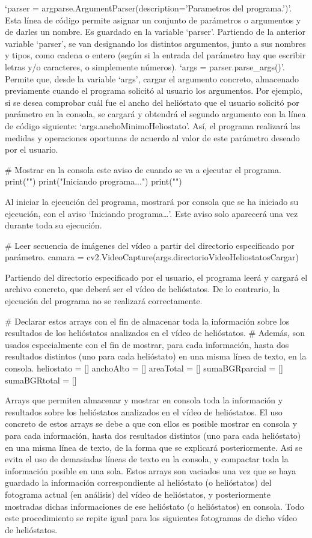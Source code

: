 ‘parser = argparse.ArgumentParser(description='Parametros del programa.')’. Esta línea de código permite asignar un conjunto de parámetros o argumentos y de darles un nombre. Es guardado en la variable ‘parser’.
Partiendo de la anterior variable ‘parser’, se van designando los distintos argumentos, junto a sus nombres y tipos, como cadena o entero (según si la entrada del parámetro hay que escribir letras y/o caracteres, o simplemente números).
‘args = parser.parse\_args()’. Permite que, desde la variable ‘args’, cargar el argumento concreto, almacenado previamente cuando el programa solicitó al usuario los argumentos. Por ejemplo, si se desea comprobar cuál fue el ancho del helióstato que el usuario solicitó por parámetro en la consola, se cargará y obtendrá el segundo argumento con la línea de código siguiente: ‘args.anchoMinimoHeliostato’. Así, el programa realizará las medidas y operaciones oportunas de acuerdo al valor de este parámetro deseado por el usuario.


\# Mostrar en la consola este aviso de cuando se va a ejecutar el programa.
print("")
print("Iniciando programa...")
print("")

Al iniciar la ejecución del programa, mostrará por consola que se ha iniciado su ejecución, con el aviso ‘Iniciando programa…’. Este aviso solo aparecerá una vez durante toda su ejecución.


\# Leer secuencia de imágenes del vídeo a partir del directorio especificado por parámetro.
camara = cv2.VideoCapture(args.directorioVideoHeliostatosCargar)

Partiendo del directorio especificado por el usuario, el programa leerá y cargará el archivo concreto, que deberá ser el vídeo de helióstatos. De lo contrario, la ejecución del programa no se realizará correctamente.


\# Declarar estos arrays con el fin de almacenar toda la información sobre los resultados de los helióstatos analizados en el vídeo de helióstatos.
\# Además, son usados especialmente con el fin de mostrar, para cada información, hasta dos resultados distintos (uno para cada helióstato) en una misma línea de texto, en la consola.
heliostato = []
anchoAlto = []
areaTotal = []
sumaBGRparcial = []
sumaBGRtotal = []

Arrays que permiten almacenar y mostrar en consola toda la información y resultados sobre los helióstatos analizados en el vídeo de helióstatos. El uso concreto de estos arrays se debe a que con ellos es posible mostrar en consola y para cada información, hasta dos resultados distintos (uno para cada helióstato) en una misma línea de texto, de la forma que se explicará posteriormente. Así se evita el uso de demasiadas líneas de texto en la consola, y compactar toda la información posible en una sola. Estos arrays son vaciados una vez que se haya guardado la información correspondiente al helióstato (o helióstatos) del fotograma actual (en análisis) del vídeo de helióstatos, y posteriormente mostradas dichas informaciones de ese helióstato (o helióstatos) en consola. Todo este procedimiento se repite igual para los siguientes fotogramas de dicho vídeo de helióstatos.



